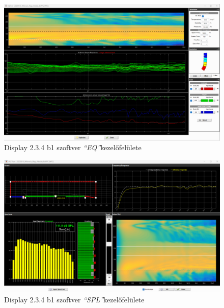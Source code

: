 \begin{figure}[H]
    \centering
    \includegraphics[width=\textwidth, keepaspectratio]{figures/display_wpc_5.png}
    \caption{Display 2.3.4 b1 szoftver \textit{``EQ''}kezelőfelülete}\label{fig:display_wpc_5}
\end{figure}

\begin{figure}[H]
    \centering
    \includegraphics[width=\textwidth, keepaspectratio]{figures/display_wpc_6.png}
    \caption{Display 2.3.4 b1 szoftver \textit{``SPL''}kezelőfelülete}\label{fig:display_wpc_6}
\end{figure}

